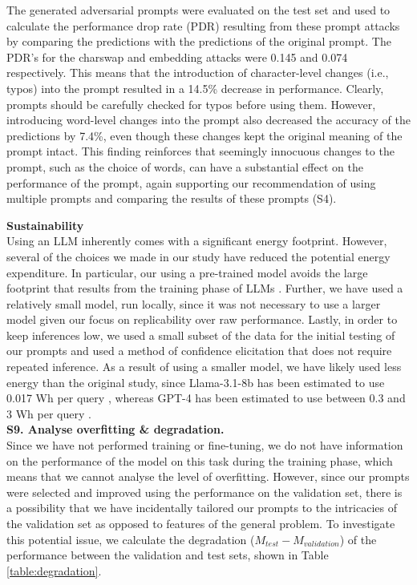 \documentclass[a4paper]{article}
\begin{document}
The generated adversarial prompts were evaluated on the test set and used to calculate the performance drop rate (PDR) resulting from these prompt attacks by comparing the predictions with the predictions of the original prompt. The PDR's for the charswap and embedding attacks were 0.145 and 0.074 respectively. This means that the introduction of character-level changes (i.e., typos) into the prompt resulted in a 14.5\% decrease in performance. Clearly, prompts should be carefully checked for typos before using them. However, introducing word-level changes into the prompt also decreased the accuracy of the predictions by 7.4\%, even though these changes kept the original meaning of the prompt intact. This finding reinforces that seemingly innocuous changes to the prompt, such as the choice of words, can have a substantial effect on the performance of the prompt, again  supporting our recommendation of using multiple prompts and comparing the results of these prompts (S4). 

\textbf{Sustainability}\\
Using an LLM inherently comes with a significant energy footprint. However, several of the choices we made in our study have reduced the potential energy expenditure. In particular, our using a pre-trained model avoids the large footprint that results from the training phase of LLMs \cite{wu2022sustainableai}. Further, we have used a relatively small model, run locally, since it was not necessary to use a larger model given our focus on replicability over raw performance. Lastly, in order to keep inferences low, we used a small subset of the data for the initial testing of our prompts and used a method of confidence elicitation that does not require repeated inference. As a result of using a smaller model, we have likely used less energy than the original study, since Llama-3.1-8b has been estimated to use 0.017 Wh per query \cite{EnergyScore2026}, whereas GPT-4 has been estimated to use between 0.3 and 3 Wh per query \cite{deVries2023,epoch2025energygpt}.\\

\textbf{S9. Analyse overfitting \& degradation.}\\
Since we have not performed training or fine-tuning, we do not have information on the performance of the model on this task during the training phase, which means that we cannot analyse the level of overfitting. However, since our prompts were selected and improved using the performance on the validation set, there is a possibility that we have incidentally tailored our prompts to the intricacies of the validation set as opposed to features of the general problem. To investigate this potential issue, we calculate the degradation ($M_{test} - M_{validation}$) of the performance between the validation and test sets, shown in Table \ref{table:degradation}.
\end{document}
